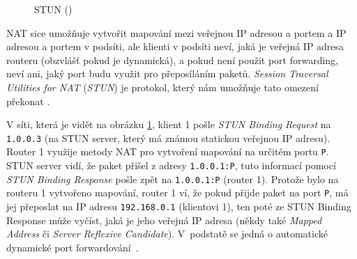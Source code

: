 \begin{figure}[H]
    \centering
    \caption{STUN (\publicPrivateIP)}
    \label{stun}
\end{figure}

NAT sice umožňuje vytvořit mapování mezi veřejnou IP adresou a portem a IP
adresou a portem v podsíti, ale klienti v podsíti neví, jaká je veřejná IP
adresa routeru (obzvlášť pokud je dynamická), a pokud není použit port
forwarding, neví ani, jaký port budu využit pro přeposíláním paketů.
\textit{Session Traversal Utilities for NAT} (\textit{STUN}) je protokol, který
nám umožňuje tato omezení překonat \cite{WebRTCForTheCurious}.

V síti, která je vidět na obrázku \ref{stun}, klient 1 pošle \textit{STUN
    Binding Request} na \texttt{1.0.0.3} (na STUN server, který má známou
statickou veřejnou IP adresu). Router 1 využije metody NAT pro vytvoření
mapování na určitém portu \texttt{P}. STUN server vidí, že paket
přišel z adresy \texttt{1.0.0.1:P}, tuto informací pomocí \textit{STUN
    Binding Response} pošle zpět na \texttt{1.0.0.1:P} (router 1). Protože
bylo na routeru 1 vytvořeno mapování, router 1 ví, že pokud přijde paket na port
\texttt{P}, má jej přeposlat na IP adresu
\texttt{192.168.0.1} (klientovi 1), ten poté ze STUN Binding Response
může vyčíst, jaká je jeho veřejná IP adresa (někdy také \textit{Mapped Address}
či \textit{Server Reflexive Candidate}). V~podstatě se jedná o automatické
dynamické port forwardování~\cite{WebRTCForTheCurious}.

